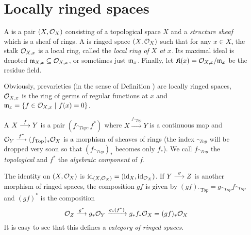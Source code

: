 \documentclass[a4paper,parskip=half,numbers=enddot, DIV=12]{scrreprt}
\begin{document}
\section{Locally ringed spaces}
\begin{defi}
    A  is a pair $(X,\mathcal{O}_X)$ consisting of a topological space $X$ and a \emph{structure sheaf} which is a sheaf of rings. A  is ringed space $(X,\mathcal{O}_X)$ such that for any $x\in X$, the stalk $\mathcal{O}_{X,x}$ is a local ring, called the \emph{local ring of $X$ at} $x$. Its maximal ideal is denoted $\mathfrak{m}_{X,x}\subseteq \mathcal{O}_{X,x}$, or sometimes just $\mathfrak{m}_x$. Finally, let $\mathfrak{K}(x) = \mathcal{O}_{X,x}/\mathfrak{m}_x$ be the residue field.
\end{defi}
\begin{rem}
    Obviously, prevarieties (in the sense of Definition ) are locally ringed spaces, $\mathcal{O}_{X,x}$ is the ring of germs of regular functions at $x$ and $\mathfrak{m}_x = \left\{f\in \mathcal{O}_{X,x} \ \middle|\  f(x) = 0 \right\}$.
\end{rem}
\begin{defi} 
    A  $X\morphism[f] Y$ is a pair $(f_{\cat{Top}}, f^*)$ where $X\xrightarrow{f_{\cat{Top}}} Y$ is a continuous map and $\Oo_Y \morphism[f^*] (f_{\cat{Top}})_*\Oo_X$ is a morphism of sheaves of rings (the index $_{\cat{Top}}$ will be dropped very soon so that $(f_{\cat{Top}})_*$ becomes only $f_*$). We call $f_{\cat{Top}}$ the \emph{topological} and $f^*$ the \emph{algebraic component} of $f$. 
    
    The identity on $(X,\mathcal{O}_X)$ is $\operatorname{id}_{(X,\mathcal{O}_X)} = (\operatorname{id}_X, \operatorname{id}_{\mathcal{O}_X})$. If $Y\morphism[g]Z$ is another morphism of ringed spaces, the composition $gf$ is given by $(gf)_{\cat{Top}} = g_{\cat{Top}} f_{\cat{Top}}$ and $(gf)^*$ is the composition 
    \begin{align*}
        \Oo_Z \morphism[g^*] g_*\Oo_Y \xrightarrow{g_*(f^*)} g_*f_*\Oo_X = (gf)_*\Oo_X
    \end{align*} 
    It is easy to see that this defines a \emph{category of ringed spaces}.
\end{defi}
\end{document}

